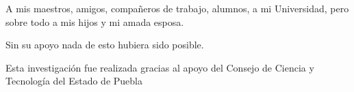 \begin{acknowledgements}
A mis maestros, amigos, compañeros de trabajo, alumnos, a mi Universidad, pero sobre todo a mis hijos y mi amada esposa.\newline

Sin su apoyo nada de esto hubiera sido posible.\newline

\end{acknowledgements}\newpage

\vspace*{\fill}
    \begin{center}
    Esta investigación fue realizada gracias al apoyo del Consejo de Ciencia y Tecnología del Estado de Puebla    
    \end{center}{}
	
\vspace*{\fill}

